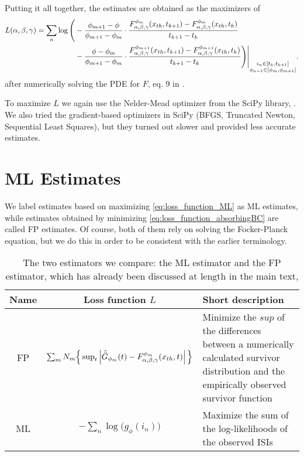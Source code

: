 Putting it all together, the estimates are obtained as the maximizers of 
\begin{align}
\label{eq:loss_function_ML}
L(\alpha,\beta,{\gamma }) = \sum_n  \log \Bigg(
&-\frac{\phi_{m+1} - \phi}{\phi_{m+1} - \phi_{m}} \cdot 
\frac{F_{\alpha,\beta,{\gamma }}^{\phi_m}({ x_{th} }, t_{k+1}) - F_{\alpha,\beta,{\gamma }}^{\phi_m}({ x_{th} },
t_{k})}{t_{k+1} - t_{k}}
\\&-
\frac{\phi - \phi_{m}}{\phi_{m+1} - \phi_{m}} \cdot 
\frac{F_{\alpha,\beta,{\gamma }}^{\phi_{m+1}}({ x_{th} }, t_{k+1}) - F_{\alpha,\beta,{\gamma }}^{\phi_{m+1}}({ x_{th} },
t_{k})}{t_{k+1} - t_{k}} 
 \Bigg)
 \Bigg|_{\substack{i_n \in [t_k, t_{k+1}] \\
 			 \phi_{n-1} \in [\phi_m, \phi_{m+1}]}} .
 			 \notag
\end{align} 
after numerically solving the PDE for $F$, eq. 9 in \cite{Iolov2013}. 

To maximize $L$ we again use the Nelder-Mead optimizer from the SciPy library,
\cite{scipy}. We also tried the gradient-based optimizers in SciPy (BFGS,
Truncated Newton, Sequential Least Squares), but they turned out slower and
provided less accurate estimates.
  
\section{ML Estimates}
We label estimates based on maximizing \cref{eq:loss_function_ML} as ML
estimates, while estimates obtained by minimizing \cref{eq:loss_function_absorbingBC}
are called FP estimates. Of course, both of them rely on solving the
Focker-Planck equation, but we do this in order to be consistent with the
earlier terminology. 

\begin{table} \begin{tabular}{ccp{4cm}} Name & Loss function $L$ & Short description
\\
\hline FP &$\sum_{m} N_m \Big\{ \sup_{t} \left| { \hat{{ \bar{G} }} }_{\phi_m}(t) -
F^{\phi_m}_{\alpha,\beta,{\gamma }}({ x_{th} },
t) \right| \Big \}$ & Minimize the $sup$ of the  differences between a
numerically calculated survivor distribution and the empirically observed
survivor function
\\
ML & $-\sum_n  \log \Big( g_\phi(i_n)
 \Big)$
& Maximize the sum of the log-likelihoods of the observed ISIs
 		\\
\hline  \end{tabular}
\caption[Comparison of Maximum Likelihood vs.\ Fokker-Planck distributional
algorithm]{The two estimators we compare: the ML estimator and  the FP
estimator, which has already been discussed at length in the main text,
\cite{Iolov2013}} \label{tab:estimators} \end{table}


